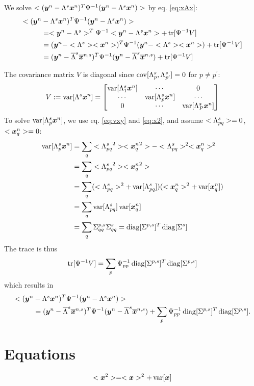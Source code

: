 \documentclass[a4paper]{article}
\begin{document}
We solve $<(\Xy-\Xl\Xx)^T\Xpsii(\Xy-\Xl\Xx)>$ by eq. \ref{eq:xAx}:
\begin{align}
  <(\Xy&-\Xl\Xx)^T\Xpsii(\Xy-\Xl\Xx)> \\
  &=<\Xy-\Xl>^T\Xpsii<\Xy-\Xl\Xx>+\Xtr[\Xpsii V] \\
  &=(\Xy-<\Xl><\Xx>)^T\Xpsii(\Xy-<\Xl><\Xx>)+\Xtr[\Xpsii V] \\
  &=(\Xy-\Xlm\Xxm)^T\Xpsii(\Xy-\Xlm\Xxm)+\Xtr[\Xpsii V]
\end{align}

The covariance matrix $V$ is diagonal since $\Xcov[\Xl_p,\Xl_{p^\prime}]=0$ for $p\ne p^\prime$:
\begin{align}
  V:=\Xvar[\Xl\Xx]=
  \begin{bmatrix}
  \Xvar[\Xl_1\Xx] & \cdots & 0 \\
  \cdots & \Xvar[\Xl_p\Xx] & \cdots \\
  0   & \cdots & \Xvar[\Xl_P\Xx]
  \end{bmatrix}
\end{align}
To solve $\Xvar[\Xl_p\Xx]$, we use eq. \ref{eq:vxy} and \ref{eq:x2}, and assume $<\Xl_{pq}>=0$, $<\Xx_q>=0$:
\begin{align}
  \Xvar[\Xl_p\Xx]
  &=\sum_q<{\Xl_{pq}}^2><{\Xx_q}^2>-<{\Xl_{pq}}>^2<{\Xx_q}>^2 \\
  &=\sum_q<{\Xl_{pq}}^2><{\Xx_q}^2> \\
  &=\sum_q (<{\Xl_{pq}}>^2+\Xvar[\Xl_{pq}])(<{\Xx_{q}}>^2+\Xvar[{\Xx_{q}}]) \\
  &=\sum_q \Xvar[\Xl_{pq}]\Xvar[{\Xx_{q}}] \\
  &=\sum_q \Xls_{qq}\Xxs_{qq}=\Xdiag[\Xls]^T\Xdiag[\Xxs]
\end{align}
The trace is thus
\begin{align}
  \Xtr[\Xpsii V]=\sum_p \Xpsii_{pp}\Xdiag[\Xls]^T\Xdiag[\Xls]
\end{align}
which results in
\begin{align}
  <(\Xy&-\Xl\Xx)^T\Xpsii(\Xy-\Xl\Xx)> \\
  &=(\Xy-\Xlm\Xxm)^T\Xpsii(\Xy-\Xlm\Xxm)+\sum_p \Xpsii_{pp}\Xdiag[\Xls]^T\Xdiag[\Xls].
\end{align}

\section{Equations}
\newcommand{\Xvx}{\bs{x}}
\newcommand{\Xvy}{\bs{y}}

\begin{align}
  \label{eq:x2}
  <\bs{x}^2>=<\bs{x}>^2+\Xvar[\bs{x}]
\end{align}
\end{document}
